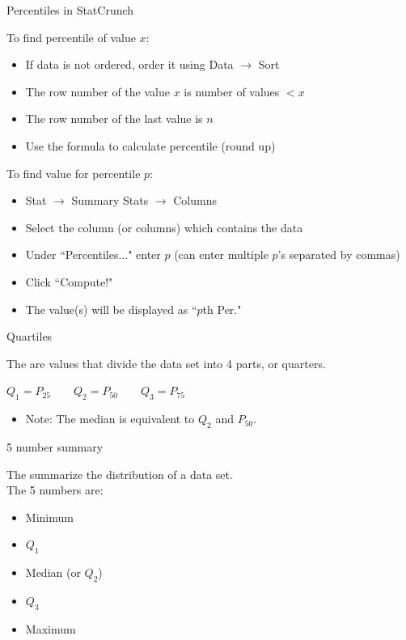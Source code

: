\documentclass[xcolor=table]{beamer}
\begin{document}
\begin{frame}{Percentiles in StatCrunch}
\begin{block}{}
To find percentile of value $x$:
\begin{itemize}
\item If data is not ordered, order it using Data $\to$ Sort
\item The row number of the value  $x$ is number of values $< x$
\item The row number of the last value is $n$
\item Use the formula to calculate percentile (round up)
\end{itemize}
To find value for percentile $p$:
\begin{itemize}
\item Stat $\to$ Summary Stats $\to$ Columns
\item Select the column (or columns) which contains the data
\item Under ``Percentiles..." enter $p$ (can enter multiple $p$'s separated by commas)
\item Click ``Compute!"
\item The value(s) will be displayed as ``$p$th Per."
\end{itemize}
\end{block}
\end{frame}


\begin{frame}{Quartiles}
\begin{block}{}
\large
The  are values that divide the data set into 4 parts, or quarters.\\
\smallskip
{\centering
$Q_1 = P_{25} \qquad Q_2 = P_{50} \qquad Q_3 = P_{75}$
\par}
\begin{itemize}
\pause
\item Note: The median is equivalent to $Q_2$ and $P_{50}$.
\end{itemize}
\end{block}
\end{frame}

\begin{frame}{5 number summary}
\begin{block}{}
\large 
The  summarize the distribution of a data set.\\
\medskip
The 5 numbers are:
\begin{itemize}
\item Minimum
\item $Q_1$
\item Median (or $Q_2$)
\item $Q_3$
\item Maximum
\end{itemize}
\end{block}
\end{frame}
\end{document}
